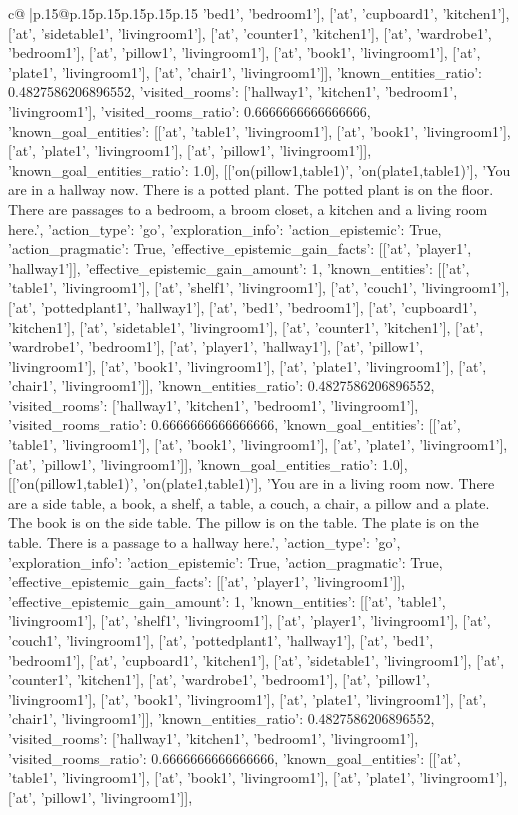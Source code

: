 \documentclass{article}
\begin{document}
{\begin{supertabular}{c@{$\;$}|p{.15\linewidth}@{}p{.15\linewidth}p{.15\linewidth}p{.15\linewidth}p{.15\linewidth}p{.15\linewidth}}
{{{'bed1', 'bedroom1'], ['at', 'cupboard1', 'kitchen1'], ['at', 'sidetable1', 'livingroom1'], ['at', 'counter1', 'kitchen1'], ['at', 'wardrobe1', 'bedroom1'], ['at', 'pillow1', 'livingroom1'], ['at', 'book1', 'livingroom1'], ['at', 'plate1', 'livingroom1'], ['at', 'chair1', 'livingroom1']], 'known_entities_ratio': 0.4827586206896552, 'visited_rooms': ['hallway1', 'kitchen1', 'bedroom1', 'livingroom1'], 'visited_rooms_ratio': 0.6666666666666666, 'known_goal_entities': [['at', 'table1', 'livingroom1'], ['at', 'book1', 'livingroom1'], ['at', 'plate1', 'livingroom1'], ['at', 'pillow1', 'livingroom1']], 'known_goal_entities_ratio': 1.0}}], [['on(pillow1,table1)', 'on(plate1,table1)'], 'You are in a hallway now. There is a potted plant. The potted plant is on the floor. There are passages to a bedroom, a broom closet, a kitchen and a living room here.\n', {'action_type': 'go', 'exploration_info': {'action_epistemic': True, 'action_pragmatic': True, 'effective_epistemic_gain_facts': [['at', 'player1', 'hallway1']], 'effective_epistemic_gain_amount': 1, 'known_entities': [['at', 'table1', 'livingroom1'], ['at', 'shelf1', 'livingroom1'], ['at', 'couch1', 'livingroom1'], ['at', 'pottedplant1', 'hallway1'], ['at', 'bed1', 'bedroom1'], ['at', 'cupboard1', 'kitchen1'], ['at', 'sidetable1', 'livingroom1'], ['at', 'counter1', 'kitchen1'], ['at', 'wardrobe1', 'bedroom1'], ['at', 'player1', 'hallway1'], ['at', 'pillow1', 'livingroom1'], ['at', 'book1', 'livingroom1'], ['at', 'plate1', 'livingroom1'], ['at', 'chair1', 'livingroom1']], 'known_entities_ratio': 0.4827586206896552, 'visited_rooms': ['hallway1', 'kitchen1', 'bedroom1', 'livingroom1'], 'visited_rooms_ratio': 0.6666666666666666, 'known_goal_entities': [['at', 'table1', 'livingroom1'], ['at', 'book1', 'livingroom1'], ['at', 'plate1', 'livingroom1'], ['at', 'pillow1', 'livingroom1']], 'known_goal_entities_ratio': 1.0}}], [['on(pillow1,table1)', 'on(plate1,table1)'], 'You are in a living room now. There are a side table, a book, a shelf, a table, a couch, a chair, a pillow and a plate. The book is on the side table. The pillow is on the table. The plate is on the table. There is a passage to a hallway here.\n', {'action_type': 'go', 'exploration_info': {'action_epistemic': True, 'action_pragmatic': True, 'effective_epistemic_gain_facts': [['at', 'player1', 'livingroom1']], 'effective_epistemic_gain_amount': 1, 'known_entities': [['at', 'table1', 'livingroom1'], ['at', 'shelf1', 'livingroom1'], ['at', 'player1', 'livingroom1'], ['at', 'couch1', 'livingroom1'], ['at', 'pottedplant1', 'hallway1'], ['at', 'bed1', 'bedroom1'], ['at', 'cupboard1', 'kitchen1'], ['at', 'sidetable1', 'livingroom1'], ['at', 'counter1', 'kitchen1'], ['at', 'wardrobe1', 'bedroom1'], ['at', 'pillow1', 'livingroom1'], ['at', 'book1', 'livingroom1'], ['at', 'plate1', 'livingroom1'], ['at', 'chair1', 'livingroom1']], 'known_entities_ratio': 0.4827586206896552, 'visited_rooms': ['hallway1', 'kitchen1', 'bedroom1', 'livingroom1'], 'visited_rooms_ratio': 0.6666666666666666, 'known_goal_entities': [['at', 'table1', 'livingroom1'], ['at', 'book1', 'livingroom1'], ['at', 'plate1', 'livingroom1'], ['at', 'pillow1', 'livingroom1']], }}}
\end{supertabular}}
\end{document}
